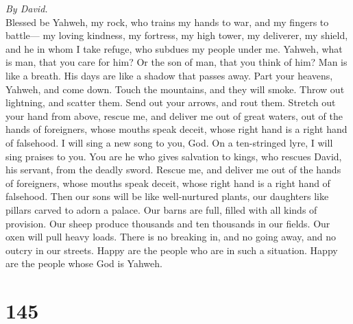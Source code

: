 \emph{By David.}\\
 Blessed be Yahweh, my rock, who trains my hands to war,
and my fingers to battle---  my loving kindness, my
fortress, my high tower, my deliverer, my shield, and he in whom I take
refuge, who subdues my people under me.  Yahweh, what is
man, that you care for him? Or the son of man, that you think of him?
 Man is like a breath. His days are like a shadow that
passes away.  Part your heavens, Yahweh, and come down.
Touch the mountains, and they will smoke.  Throw out
lightning, and scatter them. Send out your arrows, and rout them.
 Stretch out your hand from above, rescue me, and deliver
me out of great waters, out of the hands of foreigners, 
whose mouths speak deceit, whose right hand is a right hand of
falsehood.  I will sing a new song to you, God. On a
ten-stringed lyre, I will sing praises to you.  You are
he who gives salvation to kings, who rescues David, his servant, from
the deadly sword.  Rescue me, and deliver me out of the
hands of foreigners, whose mouths speak deceit, whose right hand is a
right hand of falsehood.  Then our sons will be like
well-nurtured plants, our daughters like pillars carved to adorn a
palace.  Our barns are full, filled with all kinds of
provision. Our sheep produce thousands and ten thousands in our fields.
 Our oxen will pull heavy loads. There is no breaking in,
and no going away, and no outcry in our streets.  Happy
are the people who are in such a situation. Happy are the people whose
God is Yahweh.

\hypertarget{section-144}{%
\section{145}\label{section-144}}

